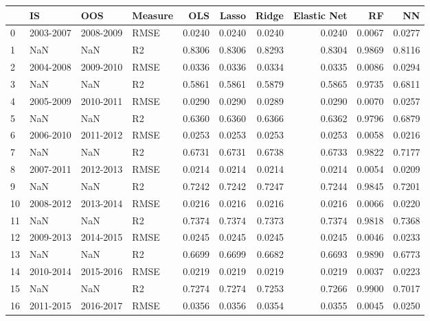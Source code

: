\begin{tabular}{llllrrrrrr}
\toprule
{} &         IS &        OOS & Measure &     OLS &   Lasso &   Ridge &  Elastic Net &      RF &      NN \\
\midrule
0  &  2003-2007 &  2008-2009 &    RMSE &  0.0240 &  0.0240 &  0.0240 &       0.0240 &  0.0067 &  0.0277 \\
1  &        NaN &        NaN &      R2 &  0.8306 &  0.8306 &  0.8293 &       0.8304 &  0.9869 &  0.8116 \\
2  &  2004-2008 &  2009-2010 &    RMSE &  0.0336 &  0.0336 &  0.0334 &       0.0335 &  0.0086 &  0.0294 \\
3  &        NaN &        NaN &      R2 &  0.5861 &  0.5861 &  0.5879 &       0.5865 &  0.9735 &  0.6811 \\
4  &  2005-2009 &  2010-2011 &    RMSE &  0.0290 &  0.0290 &  0.0289 &       0.0290 &  0.0070 &  0.0257 \\
5  &        NaN &        NaN &      R2 &  0.6360 &  0.6360 &  0.6366 &       0.6362 &  0.9796 &  0.6879 \\
6  &  2006-2010 &  2011-2012 &    RMSE &  0.0253 &  0.0253 &  0.0253 &       0.0253 &  0.0058 &  0.0216 \\
7  &        NaN &        NaN &      R2 &  0.6731 &  0.6731 &  0.6738 &       0.6733 &  0.9822 &  0.7177 \\
8  &  2007-2011 &  2012-2013 &    RMSE &  0.0214 &  0.0214 &  0.0214 &       0.0214 &  0.0054 &  0.0209 \\
9  &        NaN &        NaN &      R2 &  0.7242 &  0.7242 &  0.7247 &       0.7244 &  0.9845 &  0.7201 \\
10 &  2008-2012 &  2013-2014 &    RMSE &  0.0216 &  0.0216 &  0.0216 &       0.0216 &  0.0066 &  0.0220 \\
11 &        NaN &        NaN &      R2 &  0.7374 &  0.7374 &  0.7373 &       0.7374 &  0.9818 &  0.7368 \\
12 &  2009-2013 &  2014-2015 &    RMSE &  0.0245 &  0.0245 &  0.0245 &       0.0245 &  0.0046 &  0.0233 \\
13 &        NaN &        NaN &      R2 &  0.6699 &  0.6699 &  0.6682 &       0.6693 &  0.9890 &  0.6773 \\
14 &  2010-2014 &  2015-2016 &    RMSE &  0.0219 &  0.0219 &  0.0219 &       0.0219 &  0.0037 &  0.0223 \\
15 &        NaN &        NaN &      R2 &  0.7274 &  0.7274 &  0.7253 &       0.7266 &  0.9900 &  0.7017 \\
16 &  2011-2015 &  2016-2017 &    RMSE &  0.0356 &  0.0356 &  0.0354 &       0.0355 &  0.0045 &  0.0250 \\

\end{tabular}
